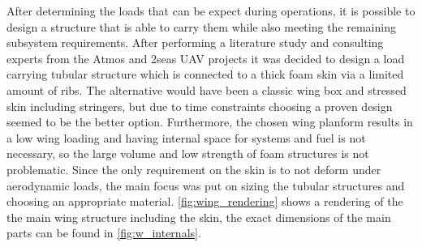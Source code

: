 After determining the loads that can be expect during operations, it is possible to design a structure that is able to carry them while also meeting the remaining subsystem requirements. After performing a literature study and consulting experts from the Atmos and 2seas UAV projects it was decided to design a load carrying tubular structure which is connected to a thick foam skin via a limited amount of ribs. The alternative would have been a classic wing box and stressed skin including stringers, but due to time constraints choosing a proven design seemed to be the better option. Furthermore, the chosen wing planform results in a low wing loading and having internal space for systems and fuel is not necessary, so the large volume and low strength of foam structures is not problematic. Since the only requirement on the skin is to not deform under aerodynamic loads, the main focus was put on sizing the tubular structures and choosing an appropriate material. \autoref{fig:wing_rendering} shows a rendering of the the main wing structure including the skin, the exact dimensions of the main parts can be found in \autoref{fig:w_internals}.

